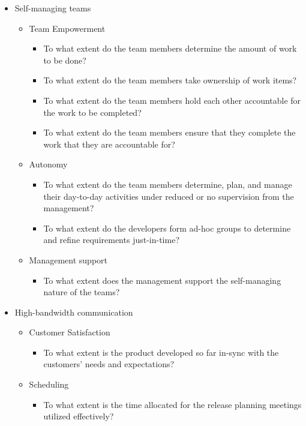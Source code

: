 \begin{appendices}
\begin{itemize}
	\item Self-managing teams
		\begin{itemize}
			\item Team Empowerment
				\begin{itemize}
					\item To what extent do the team members determine the amount of work to be done? 
					\item To what extent do the team members take ownership of work items? 
					\item To what extent do the team members hold each other accountable for the work to be completed? 
					\item To what extent do the team members ensure that they complete the work that they are accountable for?
				\end{itemize}
			\item Autonomy
				\begin{itemize}
					\item To what extent do the team members determine, plan, and manage their day-to-day activities under reduced or no supervision from the management? 
					\item To what extent do the developers form ad-hoc groups to determine and refine requirements just-in-time? 
				\end{itemize}
			\item Management support
				\begin{itemize}
					\item To what extent does the management support the self-managing nature of the teams?
				\end{itemize}
		\end{itemize}
	\item High-bandwidth communication
		\begin{itemize}
			\item Customer Satisfaction
				\begin{itemize}
					\item To what extent is the product developed so far in-sync with the customers' needs and expectations?
				\end{itemize}
			\item Scheduling
				\begin{itemize}
					\item To what extent is the time allocated for the release planning meetings utilized effectively? 

\end{itemize}
\end{itemize}
\end{itemize}
\end{appendices}

